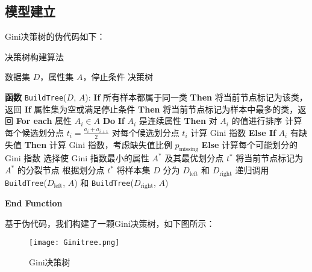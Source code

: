 \subsection{模型建立}
Gini决策树的伪代码如下：
\begin{algorithm}[H]
    \caption{决策树构建算法}
    \label{alg:decision_tree}
    \begin{algorithmic}
        \REQUIRE 数据集 $D$，属性集 $A$，停止条件
        \ENSURE 决策树

        \STATE \textbf{函数} \texttt{BuildTree}($D$, $A$):
        \STATE \quad \textbf{If} 所有样本都属于同一类 \textbf{Then}
        \STATE \quad \quad 将当前节点标记为该类，返回
        \STATE \quad \textbf{If} 属性集为空或满足停止条件 \textbf{Then}
        \STATE \quad \quad 将当前节点标记为样本中最多的类，返回
        \STATE \quad \textbf{For each} 属性 $A_i \in A$ \textbf{Do}
        \STATE \quad \quad \textbf{If} $A_i$ 是连续属性 \textbf{Then}
        \STATE \quad \quad \quad 对 $A_i$ 的值进行排序
        \STATE \quad \quad \quad 计算每个候选划分点 $t_i = \frac{a_i + a_{i+1}}{2}$
        \STATE \quad \quad \quad 对每个候选划分点 $t_i$ 计算 Gini 指数
        \STATE \quad \quad \textbf{Else If} $A_i$ 有缺失值 \textbf{Then}
        \STATE \quad \quad \quad 计算 Gini 指数，考虑缺失值比例 $p_{\text{missing}}$
        \STATE \quad \quad \textbf{Else}
        \STATE \quad \quad \quad 计算每个可能划分的 Gini 指数
        \STATE \quad 选择使 Gini 指数最小的属性 $A^*$ 及其最优划分点 $t^*$
        \STATE \quad 将当前节点标记为 $A^*$ 的分裂节点
        \STATE \quad 根据划分点 $t^*$ 将样本集 $D$ 分为 $D_{\text{left}}$ 和 $D_{\text{right}}$
        \STATE \quad 递归调用 \texttt{BuildTree}($D_{\text{left}}$, $A$) 和 \texttt{BuildTree}($D_{\text{right}}$, $A$)
        
        \STATE \textbf{End Function}
    \end{algorithmic}
\end{algorithm}
基于伪代码，我们构建了一颗Gini决策树，如下图所示：
\begin{figure}[H]
    \centering
    \texttt{[image: Ginitree.png]}
    \caption{Gini决策树}
    \label{fig:enter-label}
\end{figure}
